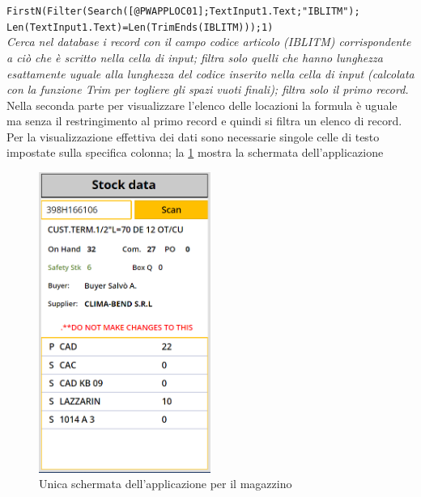 \texttt{FirstN(Filter(Search([@PWAPPLOC01];TextInput1.Text;"IBLITM");\\
        Len(TextInput1.Text)=Len(TrimEnds(IBLITM)));1)
       }\\
\textit{Cerca nel database i record con il campo codice articolo (IBLITM) corrispondente a ciò che è scritto nella cella di input; filtra solo quelli che hanno lunghezza esattamente uguale alla lunghezza del codice inserito nella cella di input (calcolata con la funzione Trim per togliere gli spazi vuoti finali); filtra solo il primo record.}\\
Nella seconda parte per visualizzare l’elenco delle locazioni la formula è uguale ma senza il restringimento al primo record e quindi si filtra un elenco di record. Per la visualizzazione effettiva dei dati sono necessarie singole celle di testo impostate sulla specifica colonna; la \figurename \space \ref*{fig:M-Applicazione} mostra la schermata dell'applicazione
\begin{figure}[H]
    \centering\includegraphics[width=0.5\textwidth, height=0.5\textheight,keepaspectratio]{immagini/M-applicazione.png}
    \caption{Unica schermata dell'applicazione per il magazzino}
    \label{fig:M-Applicazione}
\end{figure}

\newpage
